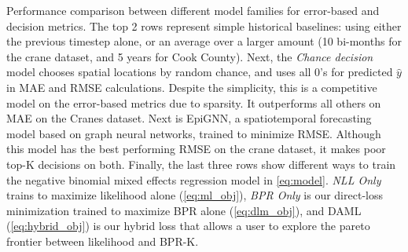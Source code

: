 \begin{table}[ht]
\caption[Performance comparison between model families for error-based and decision metrics.]{Performance comparison between different model families for error-based and decision metrics. The top 2 rows represent simple historical baselines: using either the previous timestep alone, or an average over a larger amount (10 bi-months for the crane dataset, and 5 years for Cook County). Next, the \emph{Chance decision} model chooses spatial locations by random chance, and uses all 0's for predicted $\hat{y}$ in MAE and RMSE calculations. Despite the simplicity, this is a competitive model on the error-based metrics due to sparsity. It outperforms all others on MAE on the Cranes dataset. Next is EpiGNN, a spatiotemporal forecasting model based on graph neural networks, trained to minimize RMSE. Although this model has the best performing RMSE on the crane dataset, it makes poor top-K decisions on both. Finally, the last three rows show different ways to train the negative binomial mixed effects regression model in \ref{eq:model}. \emph{NLL Only} trains to maximize likelihood alone (\ref{eq:ml_obj}), \emph{BPR Only} is our direct-loss minimization trained to maximize BPR alone (\ref{eq:dlm_obj}), and DAML (\ref{eq:hybrid_obj}) is our hybrid loss that allows a user to explore the pareto frontier between likelihood and BPR-K.}
\label{tab:results}
\end{table}
